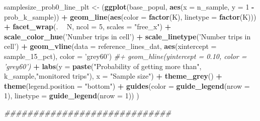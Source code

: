 \documentclass[
]{article}
\newenvironment{Shaded}{\begin{snugshade}}{\end{snugshade}}
\newcommand{\CommentTok}[1]{\textcolor[rgb]{0.56,0.35,0.01}{\textit{#1}}}
\newcommand{\DataTypeTok}[1]{\textcolor[rgb]{0.13,0.29,0.53}{#1}}
\newcommand{\DecValTok}[1]{\textcolor[rgb]{0.00,0.00,0.81}{#1}}
\newcommand{\KeywordTok}[1]{\textcolor[rgb]{0.13,0.29,0.53}{\textbf{#1}}}
\newcommand{\NormalTok}[1]{#1}
\newcommand{\OperatorTok}[1]{\textcolor[rgb]{0.81,0.36,0.00}{\textbf{#1}}}
\newcommand{\StringTok}[1]{\textcolor[rgb]{0.31,0.60,0.02}{#1}}
\begin{document}
\begin{Shaded}
\begin{Highlighting}[]
{\NormalTok{samplesize_prob0_line_plt <-}\StringTok{ }\NormalTok{(}\KeywordTok{ggplot}\NormalTok{(base_popul, }\KeywordTok{aes}\NormalTok{(}\DataTypeTok{x =}\NormalTok{ n_sample, }\DataTypeTok{y =} \DecValTok{1} \OperatorTok{-}\StringTok{ }\NormalTok{prob_k_sample)) }
            \OperatorTok{+}\StringTok{ }\KeywordTok{geom_line}\NormalTok{(}\KeywordTok{aes}\NormalTok{(}\DataTypeTok{color =} \KeywordTok{factor}\NormalTok{(K), }\DataTypeTok{linetype =} \KeywordTok{factor}\NormalTok{(K)))}
            \OperatorTok{+}\StringTok{ }\KeywordTok{facet_wrap}\NormalTok{(. }\OperatorTok{~}\StringTok{ }\NormalTok{N, }\DataTypeTok{ncol =} \DecValTok{5}\NormalTok{, }\DataTypeTok{scales =} \StringTok{"free_x"}\NormalTok{)}
            \OperatorTok{+}\StringTok{ }\KeywordTok{scale_color_hue}\NormalTok{(}\StringTok{'Number trips in cell'}\NormalTok{)}
            \OperatorTok{+}\StringTok{ }\KeywordTok{scale_linetype}\NormalTok{(}\StringTok{'Number trips in cell'}\NormalTok{)}
            \OperatorTok{+}\StringTok{ }\KeywordTok{geom_vline}\NormalTok{(}\DataTypeTok{data =}\NormalTok{ reference_lines_dat, }\KeywordTok{aes}\NormalTok{(}\DataTypeTok{xintercept =}\NormalTok{ sample_}\DecValTok{15}\NormalTok{_pct), }\DataTypeTok{color =} \StringTok{'grey60'}\NormalTok{)}
            \CommentTok{#+ geom_hline(yintercept = 0.10, color = 'grey60')}
            \OperatorTok{+}\StringTok{ }\KeywordTok{labs}\NormalTok{(}\DataTypeTok{y =} \KeywordTok{paste}\NormalTok{(}\StringTok{"Probability of getting more than"}\NormalTok{, k_sample,}\StringTok{"monitored trips"}\NormalTok{),}
                    \DataTypeTok{x =} \StringTok{"Sample size"}\NormalTok{)}
            \OperatorTok{+}\StringTok{ }\KeywordTok{theme_grey}\NormalTok{()}
            \OperatorTok{+}\StringTok{ }\KeywordTok{theme}\NormalTok{(}\DataTypeTok{legend.position =} \StringTok{"bottom"}\NormalTok{)}
            \OperatorTok{+}\StringTok{ }\KeywordTok{guides}\NormalTok{(}\DataTypeTok{color =} \KeywordTok{guide_legend}\NormalTok{(}\DataTypeTok{nrow =} \DecValTok{1}\NormalTok{), }\DataTypeTok{linetype =} \KeywordTok{guide_legend}\NormalTok{(}\DataTypeTok{nrow =} \DecValTok{1}\NormalTok{))}
\NormalTok{            )}

\CommentTok{#############################}

}
\end{Highlighting}
\end{Shaded}
\end{document}
